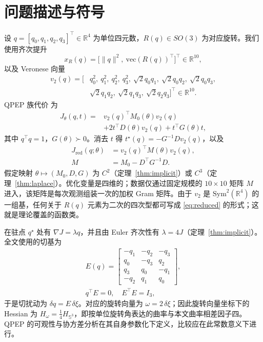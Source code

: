 \section{问题描述与符号}\label{sec:formulation}

设 $q=[q_0,q_1,q_2,q_3]^\top\in\mathbb{R}^4$ 为单位四元数，$R(q)\in SO(3)$ 为对应旋转。我们使用齐次提升
\begin{equation}
x_R(q)=\big[\|q\|^2,\ \mathrm{vec}(R(q))^\top\big]^\top\in\mathbb{R}^{10},
\label{eq:lift}
\end{equation}
以及 Veronese 向量
\begin{equation}
\begin{split}
v_2(q)=\big[&q_0^2,\ q_1^2,\ q_2^2,\ q_3^2,\ \sqrt2q_0q_1,\ \sqrt2q_0q_2,\ \sqrt2q_0q_3,\\
&\sqrt2q_1q_2,\ \sqrt2q_1q_3,\ \sqrt2q_2q_3\big]^\top\in\mathbb{R}^{10}.
\end{split}
\label{eq:veronese}
\end{equation}
QPEP 族代价 \cite{wu2022qpep} 为
\begin{equation}
\begin{split}
J_\theta(q,t)={}&v_2(q)^\top M_0(\theta)v_2(q)\\
&+2t^\top D(\theta)v_2(q)+t^\top G(\theta)t,
\end{split}
\label{eq:cost}
\end{equation}
其中 $q^\top q=1$，$G(\theta)\succ0$。消去 $t$ 得 $t^\star(q)=-G^{-1}Dv_2(q)$，以及
\begin{equation}
\begin{split}
J_{\mathrm{red}}(q;\theta)&=v_2(q)^\top M(\theta)v_2(q),\\
M&=M_0-D^\top G^{-1}D .
\end{split}
\label{eq:reduced}
\end{equation}
假定映射 $\theta\mapsto(M_0,D,G)$ 为 $C^2$（定理~\ref{thm:implicit}）或 $C^3$（定理~\ref{thm:laplace}）。优化变量是四维的；数据仅通过固定规模的 $10\times10$ 矩阵 $M$ 进入，该矩阵是每次观测组装一次的加权 Gram 矩阵。由于 $v_2$ 是 $\mathrm{Sym}^2(\mathbb{R}^4)$ 的一组基，任何关于 $R(q)$ 元素为二次的四次型都可写成 \eqref{eq:reduced} 的形式；这就是理论覆盖的函数类。

在驻点 $q^\star$ 处有 $\nabla J=\lambda q$，并且由 Euler 齐次性有 $\lambda=4J$（定理~\ref{thm:implicit}）。全文使用的切基为
\begin{equation}
\begin{gathered}
E(q)=\begin{bmatrix}-q_1&-q_2&-q_3\\ q_0&-q_3&q_2\\ q_3&q_0&-q_1\\ -q_2&q_1&q_0\end{bmatrix},\\
q^\top E=0,\quad E^\top E=I_3,
\end{gathered}
\label{eq:tangent}
\end{equation}
于是切扰动为 $\delta q=E\,\delta\xi$。对应的旋转向量为 $\omega=2\,\delta\xi$；因此旋转向量坐标下的 Hessian 为 $H_\omega=\tfrac14H_{\mathbb{S}^3}$，即按单位旋转角表达的曲率与本文曲率相差因子四。QPEP 的可观性与协方差分析在其自身参数化下定义，比较应在此常数意义下进行。

